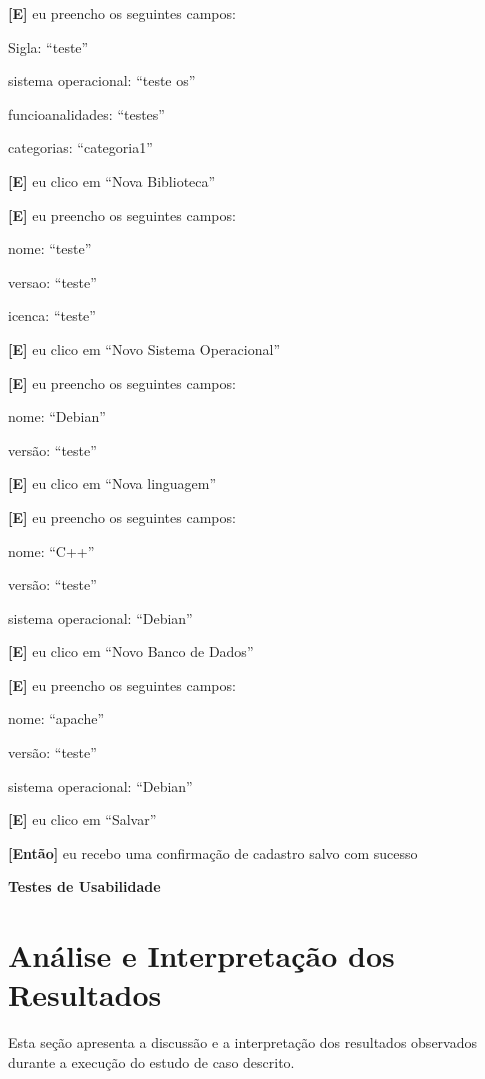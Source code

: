 \begin{itemize}
	\textbf{[E]} eu preencho os seguintes campos: 

  		\subitem Sigla: ``teste''

  		\subitem sistema operacional: ``teste os''

  		\subitem funcioanalidades: ``testes''

  		\subitem categorias: ``categoria1''
 	
 	\textbf{[E]} eu clico em ``Nova Biblioteca''

 	\textbf{[E]} eu preencho os seguintes campos: 

 		\subitem nome: ``teste''

 		\subitem versao: ``teste''

 		\subitem icenca: ``teste''

 	\textbf{[E]} eu clico em ``Novo Sistema Operacional''

 	\textbf{[E]} eu preencho os seguintes campos: 

 		\subitem nome: ``Debian''

 		\subitem versão: ``teste''

 	\textbf{[E]} eu clico em ``Nova linguagem''

 	\textbf{[E]} eu preencho os seguintes campos: 

 		\subitem nome: ``C++''

 		\subitem versão: ``teste''

 		\subitem sistema operacional: ``Debian''

 	\textbf{[E]} eu clico em ``Novo Banco de Dados''

 	\textbf{[E]} eu preencho os seguintes campos: 

 		\subitem nome: ``apache''

 		\subitem versão: ``teste''

 		\subitem sistema operacional: ``Debian''

	\textbf{[E]} eu clico em ``Salvar''

	\textbf{[Então]} eu recebo uma confirmação de cadastro salvo com sucesso
	
	
\end{itemize}

\textbf{Testes de Usabilidade}

 
\section{Análise e Interpretação dos Resultados}

Esta seção apresenta a discussão e a interpretação dos resultados observados durante a execução do estudo de caso descrito.

